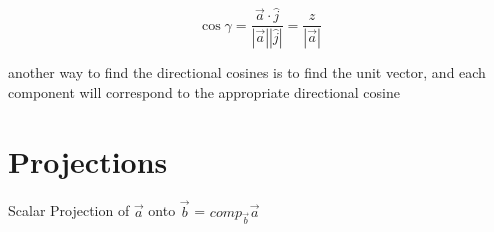 \documentclass{article}
\begin{document}
$$\cos\gamma = \frac{\vec{a} \cdot \hat{j}}{|\vec{a}| |\hat{j}|} = \frac{z}{|\vec{a}|}$$

another way to find the directional cosines is to find the unit vector, and each component will correspond to the appropriate directional cosine

\newpage
\section{Projections}

Scalar Projection of $\vec{a}$ onto $\vec{b}$ = $comp_{\vec{b}}\vec{a}$

\begin{center}
    
\end{center}
\end{document}

